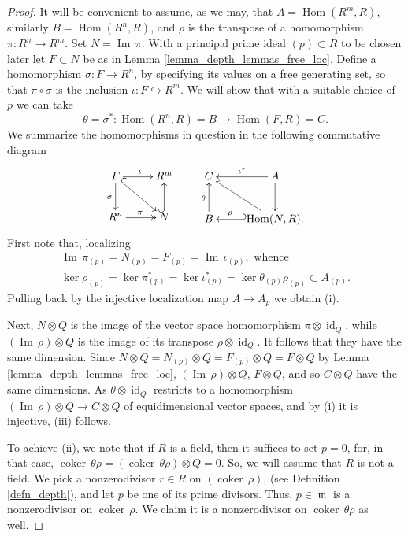 \documentclass{amsart}
\numberwithin{equation}{section}
\theoremstyle{definition}
\theoremstyle{plain}
\theoremstyle{remark}
\begin{document}
\begin{proof}
It will be convenient to assume, as we may, that $A={{\mathop{\mathrm{Hom}}}}(R^m,R)$, similarly 
$B={{\mathop{\mathrm{Hom}}}}(R^n,R)$, and $\rho$ is the transpose of a homomorphism 
$\pi:R^n\rightarrow R^m$.
Set $N={{\mathop{\mathrm{Im\,}}}} \pi$. With a principal prime ideal $(p)\subset R$ to be chosen 
later let
$F\subset N$ be as in Lemma \ref{lemma_depth_lemmas_free_loc}.
Define  a homomorphism $\sigma:F\rightarrow R^n$, by specifying its values
on a free generating set, so that $\pi\circ\sigma$ is the inclusion 
$\iota:F\hookrightarrow R^m$.
We will show that with a suitable choice of $p$ we can take
\[
\theta=\sigma^*:{{\mathop{\mathrm{Hom}}}}(R^n,R)=B\rightarrow{{\mathop{\mathrm{Hom}}}}(F,R)=C.
\]
We summarize the homomorphisms in question in the following commutative diagram
\[
\xymatrix{
F\ar[d]_\sigma \ar@{^{(}->}[dr] \ar[r]^\iota &R^m\\
R^n \ar@{->>}[r]^\pi &N \ar@{^{(}->}[u] \\
}
\qquad
\xymatrix{
C & A\ar[d] \ar[l]_{\iota^*} \\
  B \ar[u]^\theta &{{\mathop{\mathrm{Hom}}}}(N,R).\ar@{_{(}->}[l]_-\rho\ar[ul] 
}
\]
First note that, localizing 
\begin{align}\label{eq_localizing}
{{\mathop{\mathrm{Im\,}}}} \pi_{(p)}=N_{(p)}=F_{(p)}={{\mathop{\mathrm{Im\,}}}} \iota_{(p)}, \text{ whence }\\
\ker \rho_{(p)}=\ker \pi_{(p)}^*=\ker \iota_{(p)}^*=\ker \theta_{(p)}\rho_{(p)}\subset A_{(p)}. \nonumber
\end{align}
Pulling back by the injective localization map $A\rightarrow A_p$ we obtain
{(i)}.

Next, $N\otimes Q$ is the image of the vector space homomorphism 
$\pi\otimes {{\mathop{\mathrm{id}}}}_Q$, while $({{\mathop{\mathrm{Im\,}}}} \rho)\otimes Q$ is the image of its 
transpose $\rho\otimes{{\mathop{\mathrm{id}}}}_Q$. It follows that they have the
same dimension. Since 
$N\otimes Q=N_{(p)}\otimes Q=F_{(p)}\otimes Q=F\otimes Q$ by Lemma 
\ref{lemma_depth_lemmas_free_loc}, $({{\mathop{\mathrm{Im\,}}}} \rho)\otimes Q$, $F\otimes Q$, and so
$C\otimes Q$ have the same dimensions. As $\theta\otimes{{\mathop{\mathrm{id}}}}_Q$ 
restricts to  a homomorphism 
$({{\mathop{\mathrm{Im\,}}}} \rho)\otimes Q\rightarrow C\otimes Q$
of equidimensional vector spaces, and by {(i)} it is injective, 
{(iii)} follows.

To achieve {(ii)}, we note that if $R$ is a field, then 
it suffices to set $p=0$, for, in that case, ${{\mathop{\mathrm{coker\,}}}} \theta\rho=({{\mathop{\mathrm{coker\,}}}} \theta\rho)\otimes Q=0$.
So, we will assume that $R$ is not a field.
We pick a nonzerodivisor 
$r\in R$ 
on $({{\mathop{\mathrm{coker\,}}}} \rho)$, (see Definition \ref{defn_depth}), 
and let $p$ be one of its prime
divisors. Thus, $p\in{{\mathop{\mathfrak{m}}}}$ is a nonzerodivisor on ${{\mathop{\mathrm{coker\,}}}} \rho$. We claim
it is a nonzerodivisor on ${{\mathop{\mathrm{coker\,}}}} \theta\rho$ as well.


\end{proof}
\end{document}
